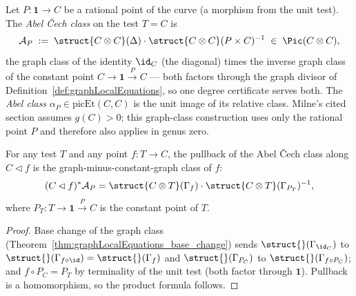 \begin{definition}
  \label{def:abelCechClass}
  \leanok
  Let \(P \colon \mathbf{1} \to C\) be a rational point of the curve (a morphism from the
  unit test). The \emph{Abel \v Cech class} on the test \(T = C\) is
  \[
    \mathcal A_P \;:=\; \struct{C \otimes C}(\Delta) \cdot \struct{C \otimes C}(P \times C)^{-1}
      \;\in\; \Pic(C \otimes C),
  \]
  the graph class of the identity \(\id_C\) (the diagonal) times the inverse graph class of
  the constant point \(C \to \mathbf 1 \xrightarrow{P} C\) — both factors through the graph
  divisor of Definition~\ref{def:graphLocalEquations}, so one degree certificate serves
  both. The \emph{Abel class} \(\alpha_P \in \mathrm{picEt}(C, C)\) is the unit image of its
  relative class. Milne's cited section assumes \(g(C)>0\); this graph-class construction
  uses only the rational point \(P\) and therefore also applies in genus zero.
\end{definition}

\begin{theorem}
  \label{thm:cechPicMap_abelCechClass}
  \leanok
  For any test \(T\) and any point \(f \colon T \to C\), the pullback of the Abel \v Cech
  class along \(C \lhd f\) is the graph-minus-constant-graph class of \(f\):
  \[
    (C \lhd f)^{*} \mathcal A_P
      = \struct{C \otimes T}(\Gamma_f)\cdot\struct{C \otimes T}(\Gamma_{P_T})^{-1},
  \]
  where \(P_T \colon T \to \mathbf 1 \xrightarrow{P} C\) is the constant point of \(T\).
\end{theorem}
\begin{proof}
  \leanok
  Base change of the graph class (Theorem~\ref{thm:graphLocalEquations_base_change}) sends
  \(\struct{}(\Gamma_{\id_C})\) to \(\struct{}(\Gamma_{f \circ \id}) = \struct{}(\Gamma_f)\)
  and \(\struct{}(\Gamma_{P_C})\) to \(\struct{}(\Gamma_{f \circ P_C})\); and
  \(f \circ P_C = P_T\) by terminality of the unit test (both factor through
  \(\mathbf 1\)). Pullback is a homomorphism, so the product formula follows.
\end{proof}

